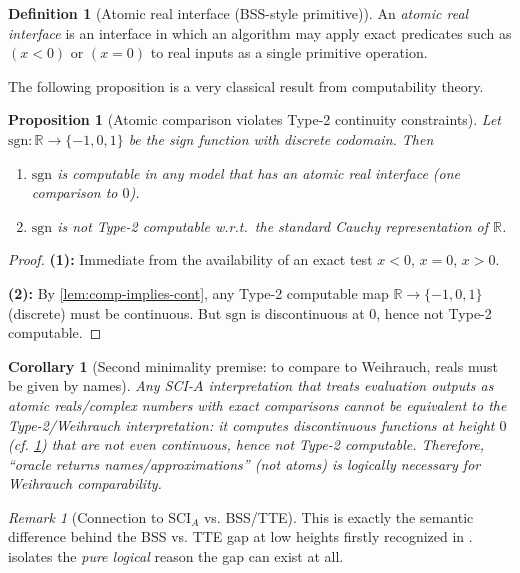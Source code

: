 \documentclass{lmcs} %
\theoremstyle{plain}
\theoremstyle{plain}
\newtheorem{corollary}[theorem]{Corollary}
\newtheorem{proposition}[theorem]{Proposition}
\theoremstyle{definition}
\newtheorem{definition}[theorem]{Definition}
\theoremstyle{remark}
\newtheorem{remark}[theorem]{Remark}
\theoremstyle{definition}
\theoremstyle{remark}
\numberwithin{equation}{section}
\newcommand{\R}{\mathbb{R}}
\begin{document}
\begin{definition}[Atomic real interface (BSS-style primitive)]
An \textit{atomic real interface} is an interface in which an algorithm may apply exact predicates
such as $(x<0)$ or $(x=0)$ to real inputs as a single primitive operation.
\end{definition}

The following proposition is a very classical result from computability theory.

\begin{proposition}[Atomic comparison violates Type-2 continuity constraints]\label{prop:atomic-breaks}
Let $\mathrm{sgn}:\R\to\{-1,0,1\}$ be the sign function with discrete codomain.
Then
\begin{enumerate}
\item $\mathrm{sgn}$ is computable in any model that has an atomic real interface (one comparison to $0$).
\item $\mathrm{sgn}$ is not Type-2 computable w.r.t.\ the standard Cauchy representation of $\R$.
\end{enumerate}
\end{proposition}

\begin{proof}
\textbf{(1):} Immediate from the availability of an exact test $x<0$, $x=0$, $x>0$.

\textbf{(2):} By \cref{lem:comp-implies-cont}, any Type-2 computable map $\R\to\{-1,0,1\}$ (discrete)
must be continuous. But $\mathrm{sgn}$ is discontinuous at $0$, hence not Type-2 computable.
\end{proof}

\begin{corollary}[Second minimality premise: to compare to Weihrauch, reals must be given by names]\label{cor:names-not-atoms}
Any SCI-$A$ interpretation that treats evaluation outputs as \textit{atomic} reals/complex numbers with exact comparisons
cannot be equivalent to the Type-2/Weihrauch interpretation: it computes discontinuous functions at height $0$
(cf. \cref{prop:atomic-breaks}) that are not even continuous, hence not Type-2 computable.
Therefore, \enquote{oracle returns names/approximations} (not atoms) is logically necessary for Weihrauch comparability.
\end{corollary}

\begin{remark}[Connection to SCI$_A$ vs. BSS/TTE]
This is exactly the semantic difference behind the BSS vs. TTE gap at low heights firstly recognized in \cite[Obs.~43, Thm.~44]{neumann2018topological}.  isolates the \textit{pure logical} reason the gap can exist at all.
\end{remark}
\end{document}
